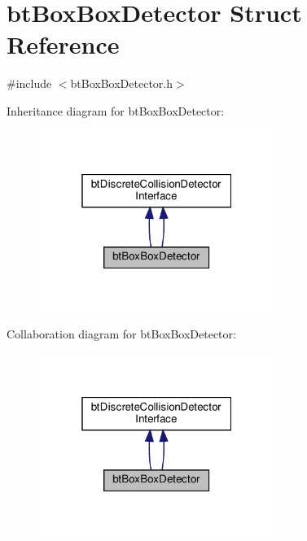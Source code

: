 \hypertarget{structbtBoxBoxDetector}{}\section{bt\+Box\+Box\+Detector Struct Reference}
\label{structbtBoxBoxDetector}


{\ttfamily \#include $<$bt\+Box\+Box\+Detector.\+h$>$}



Inheritance diagram for bt\+Box\+Box\+Detector\+:
\nopagebreak
\begin{figure}[H]
\begin{center}
\leavevmode
\includegraphics[width=217pt]{structbtBoxBoxDetector__inherit__graph}
\end{center}
\end{figure}


Collaboration diagram for bt\+Box\+Box\+Detector\+:
\nopagebreak
\begin{figure}[H]
\begin{center}
\leavevmode
\includegraphics[width=217pt]{structbtBoxBoxDetector__coll__graph}
\end{center}
\end{figure}
